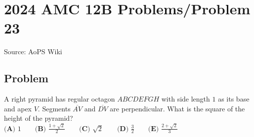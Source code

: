 \documentclass[12pt]{article}
\begin{document}
\section*{{2024 AMC 12B Problems/Problem 23}}
Source: AoPS Wiki

\subsection*{Problem}
A right pyramid has regular octagon $ABCDEFGH$ with side length $1$ as its base and apex $V.$ Segments $\overline{AV}$ and $\overline{DV}$ are perpendicular. What is the square of the height of the pyramid? $\textbf{(A) }1 \qquad \textbf{(B) }\frac{1+\sqrt2}{2} \qquad \textbf{(C) }\sqrt2 \qquad \textbf{(D) }\frac32 \qquad \textbf{(E) }\frac{2+\sqrt2}{3} \qquad$
\end{document}
